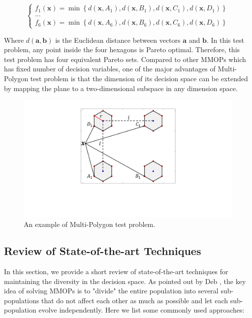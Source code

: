 \documentclass[conference]{IEEEtran}
\begin{document}
\begin{equation*}
\left\{
\begin{array}{c}{f_{1}(\boldsymbol{x})=\min \left\{d\left(\boldsymbol{x}, A_{1}\right), d\left(\boldsymbol{x}, B_{1}\right), d\left(\boldsymbol{x}, C_{1}\right), d\left(\boldsymbol{x}, D_{1}\right)\right\}} \\ \dots \\ {{f_{6}}(\boldsymbol{x})=\min \left\{d\left(\boldsymbol{x}, A_{6}\right), d\left(\boldsymbol{x}, B_{6}\right), d\left(\boldsymbol{x}, C_{6}\right), d\left(\boldsymbol{x}, D_{6}\right)\right\}}\end{array}
\right.
\end{equation*}

Where $d(\boldsymbol{a} ,\boldsymbol{b})$ is the Euclidean distance between vectors $\boldsymbol{a}$ and $\boldsymbol{b}$.  In this test problem, any point inside the four hexagons is Pareto optimal. Therefore, this test problem has four equivalent Pareto sets. Compared to other MMOPs which has fixed number of decision variables, one of the major advantages of Multi-Polygon test problem is that the dimension of its decision space can be extended by mapping the plane to a two-dimensional subspace in any dimension space.

\begin{figure}[htbp]
	\centering
	\includegraphics[width=.25\textwidth]{Section2/Problem}
	\caption{An example of Multi-Polygon test problem.}
	\label{fig:Multi-Polygon Problem}
\end{figure}

\subsection{Review of State-of-the-art Techniques}
\label{Review of State-of-the-art Techniques}
In this section, we provide a short review of state-of-the-art techniques for maintaining the diversity in the decision space. As pointed out by Deb \cite{deb2001multi}, the key idea of solving MMOPs is to "divide" the entire population into several sub-populations that do not affect each other as much as possible and let each sub-population evolve independently. Here we list some commonly used approaches:
\end{document}

